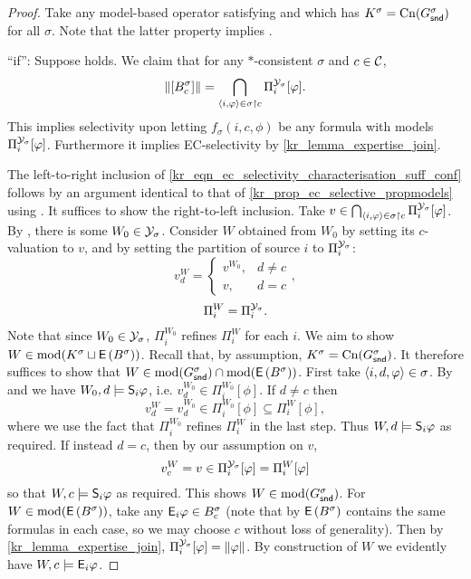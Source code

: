 \begin{proof}
    Take any model-based operator satisfying \consistency{} and which has
    $K^\sigma = \cn(G^\sigma_\snd)$ for all $\sigma$. Note that the latter
    property implies \soundness{}.

    ``if'': Suppose \determination{} holds. We claim that for any
    $\ast$-consistent $\sigma$ and $c \in \C$,
    \begin{equation}
        \label{kr_eqn_ec_selectivity_characterisation_suff_conf}
        \propmods{\proppart{B^\sigma_c}}
        =
        \bigcap_{\tuple{i, \phi} \in \sigma \rs c}{
            \Pi^{\Y_\sigma}_i[\phi]
        }.
    \end{equation}
    This implies selectivity upon letting $f_\sigma(i, c, \phi)$ be any
    formula with models $\Pi^{\Y_\sigma}_i[\phi]$. Furthermore it implies
    EC-selectivity by \cref{kr_lemma_expertise_join}.

    The left-to-right inclusion of
    \cref{kr_eqn_ec_selectivity_characterisation_suff_conf} follows by an
    argument identical to that of \cref{kr_prop_ec_selective_propmodels} using
    \soundness{}. It suffices to show the right-to-left inclusion. Take $v \in
    \bigcap_{\tuple{i, \phi} \in \sigma \rs c}{ \Pi^{\Y_\sigma}_i[\phi] }$. By
    \consistency{}, there is some $W_0 \in \Y_\sigma$. Consider $W$ obtained
    from $W_0$ by setting its $c$-valuation to $v$, and by setting the
    partition of source $i$ to $\Pi^{\Y_\sigma}_i$:
    \[
        v^W_d = \begin{cases}
            v^{W_0},& d \ne c \\
            v,& d = c
        \end{cases},
    \]
    \[
        \Pi^W_i = \Pi^{\Y_\sigma}_i.
    \]
    Note that since $W_0 \in \Y_\sigma$, $\Pi^{W_0}_i$ refines $\Pi^W_i$ for
    each $i$. We aim to show $W \in \mods(K^\sigma \sqcup \exppart{B^\sigma})$.
    Recall that, by assumption, $K^\sigma = \cn(G^\sigma_\snd)$. It therefore
    suffices to show that $W \in \mods(G^\sigma_\snd) \cap
    \mods(\exppart{B^\sigma})$. First take $\tuple{i, d, \phi} \in \sigma$.
    By \soundness{} and \containment{} we have $W_0, d \models \S_i\phi$, i.e.
    $v^{W_0}_d \in \Pi^{W_0}_i[\phi]$. If $d \ne c$ then
    \[
        v^W_d = v^{W_0}_d \in \Pi^{W_0}_i[\phi] \subseteq \Pi^W_i[\phi],
    \]
    where we use the fact that $\Pi^{W_0}_i$ refines $\Pi^W_i$ in the last
    step. Thus $W, d \models \S_i\phi$ as required. If instead $d = c$, then
    by our assumption on $v$,
    \[
        v^W_c = v \in \Pi^{\Y_\sigma}_i[\phi] = \Pi^W_i[\phi]
    \]
    so that $W, c \models \S_i\phi$ as required. This shows $W \in
    \mods(G^\sigma_\snd)$. For $W \in \mods(\exppart{B^\sigma})$, take any
    $\E_i\phi \in B^\sigma_c$ (note that by \closure{} $\exppart{B^\sigma}$
    contains the same formulas in each case, so we may choose $c$ without loss
    of generality). Then by \cref{kr_lemma_expertise_join},
    $\Pi^{\Y_\sigma}_i[\phi] = \|\phi\|$. By construction of $W$ we evidently
    have $W, c \models \E_i\phi$.


\end{proof}
